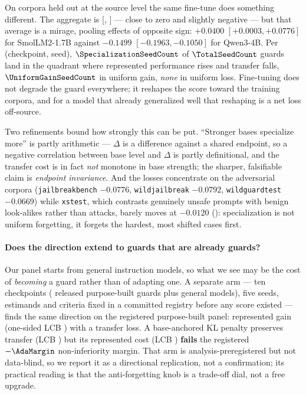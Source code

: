 \documentclass[manuscript,screen,review,anonymous]{acmart}
\newcommand{\code}[1]{\texttt{\small #1}}
\begin{document}
On corpora held out at the source level the same fine-tune does something different. The aggregate is
\TransferDelta{} [\TransferCILower, \TransferCIUpper] --- close to zero and slightly negative --- but
that average is a mirage, pooling effects of opposite sign: $+0.0400$ $[+0.0003,+0.0776]$ for
SmolLM2-1.7B against $-0.1499$ $[-0.1963,-0.1050]$ for Qwen3-4B. Per (checkpoint, seed),
$\SpecializationSeedCount$ of $\TotalSeedCount$ guards land in the quadrant where represented
performance rises and transfer falls, $\UniformGainSeedCount$ in uniform gain, \emph{none} in uniform
loss. Fine-tuning does not degrade the guard everywhere; it reshapes the score toward the training
corpora, and for a model that already generalized well that reshaping is a net loss off-source.

Two refinements bound how strongly this can be put. ``Stronger bases specialize more'' is partly
arithmetic --- $\Delta$ is a difference against a shared endpoint, so a negative correlation between base
level and $\Delta$ is partly definitional, and the transfer cost is in fact \emph{not} monotone in base
strength; the sharper, falsifiable claim is \emph{endpoint invariance}. And the losses concentrate on the
adversarial corpora (\code{jailbreakbench} $-0.0776$, \code{wildjailbreak} $-0.0792$,
\code{wildguardtest} $-0.0669$) while \code{xstest}, which contrasts genuinely unsafe prompts with benign
look-alikes rather than attacks, barely moves at $-0.0120$ (): specialization is
not uniform forgetting, it forgets the hardest, most shifted cases first.

\paragraph{Does the direction extend to guards that are already guards?} Our panel starts from general
instruction models, so what we see may be the cost of \emph{becoming} a guard rather than of adapting
one. A separate arm --- ten checkpoints (\AdaNCheckpointsPB{} released purpose-built guards plus
\AdaNCheckpointsGen{} general models), five seeds, estimands and criteria fixed in a committed registry
before any score existed --- finds the same direction on the registered purpose-built panel:
represented gain \AdaHGain{} (one-sided LCB \AdaHGainLCB) with a transfer loss. A base-anchored KL
penalty preserves transfer (LCB \AdaHPreserveLCB) but its represented cost \AdaHCost{}
(LCB \AdaHCostLCB) \textbf{fails} the registered $-\AdaMargin$ non-inferiority margin. That arm is
analysis-preregistered but not data-blind, so we report it as a directional replication, not a
confirmation; its practical reading is that the anti-forgetting knob is a trade-off dial, not a free
upgrade.
\end{document}
